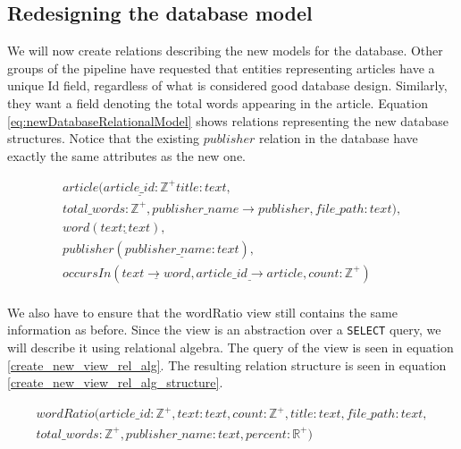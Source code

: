\subsection{Redesigning the database model}\label{databaseModelRedesignNF}
We will now create relations describing the new models for the database.
Other groups of the \knox{} pipeline have requested that entities representing articles have a unique Id field, regardless of what is considered good database design.
Similarly, they want a field denoting the total words appearing in the article.
Equation \ref{eq:newDatabaseRelationalModel} shows relations representing the new database structures.
Notice that the existing $publisher$ relation in the database have exactly the same attributes as the new one.

\begin{equation}\label{eq:newDatabaseRelationalModel}
    \begin{split}
        article(\underline{article\_id: \mathbb{Z^+}} title:text,\\ total\_words:\mathbb{Z^+}, publisher\_name \rightarrow publisher, file\_path:text), \\
        word(\underline{text:text}),\\
        publisher(\underline{publisher\_name:text}),\\
        occursIn(\underline{text \rightarrow word}, \underline{article\_id \rightarrow article}, count:\mathbb{Z^+})\\
    \end{split}
\end{equation}

We also have to ensure that the wordRatio view still contains the same information as before.
Since the view is an abstraction over a \texttt{SELECT} query, we will describe it using relational algebra.
The query of the view is seen in equation \ref{create_new_view_rel_alg}.
The resulting relation structure is seen in equation \ref{create_new_view_rel_alg_structure}.

\begin{equation}\label{create_new_view_rel_alg_structure}
    \begin{split}
        wordRatio(article\_id:\mathbb{Z^+}, text:text, count:\mathbb{Z^+},title:text, file\_path:text,\\ total\_words:\mathbb{Z^+}, publisher\_name:text, percent:\mathbb{R^+})
    \end{split}
\end{equation}

